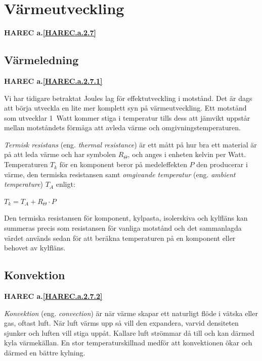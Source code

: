\section{Värmeutveckling}

\textbf{
HAREC a.\ref{HAREC.a.2.7}\label{myHAREC.a.2.7}
}


\subsection{Värmeledning}

\textbf{
HAREC a.\ref{HAREC.a.2.7.1}\label{myHAREC.a.2.7.1}
}


Vi har tidigare betraktat Joules lag för effektutveckling i motstånd.
Det är dags att börja utveckla en lite mer komplett syn på värmeutveckling.
Ett motstånd som utvecklar 1~Watt kommer stiga i temperatur tills dess att
jämvikt uppstår mellan motståndets förmåga att avleda värme och
omgivningstemperaturen.

\emph{Termisk resistans} (eng. \emph{thermal resistance}) är ett mått på
hur bra ett material är på att leda värme och har symbolen \(R_\Theta\),
och anges i enheten kelvin per Watt. Temperaturen \(T_k\) för en
komponent beror på medeleffekten \(P\) den producerar i värme, den
termiska resistansen samt \emph{omgivande temperatur} (eng.
\emph{ambient temperature}) \(T_A\) enligt:

\(T_k = T_A + R_\Theta \cdot P\)

Den termiska resistansen för komponent, kylpasta, isolerskiva och kylfläns
kan summeras precis som resistansen för vanliga motstånd och det
sammanlagda värdet används sedan för att beräkna temperaturen på en
komponent eller behovet av kylfläns.

\subsection{Konvektion}
\textbf{
HAREC a.\ref{HAREC.a.2.7.2}\label{myHAREC.a.2.7.2}
}

\emph{Konvektion} (eng. \emph{convection}) är när värme skapar ett
naturligt flöde i vätska eller gas, oftast luft. När luft värms upp så
vill den expandera, varvid densiteten sjunker och luften vill stiga uppåt.
Kallare luft strömmar då till och kan därmed kyla värmekällan. En stor
temperaturskillnad medför att konvektionen ökar och därmed en bättre
kylning.

